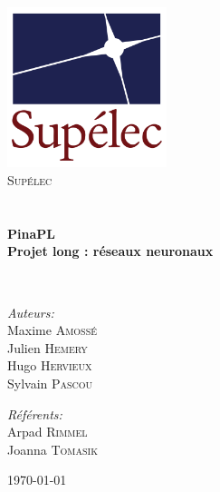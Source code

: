 
\begin{titlepage}
\begin{center}

\includegraphics[width=0.35\textwidth]{./images/logo.png}~\\[1cm]

\textsc{\LARGE Supélec}\\[1.5cm]

\textsc{\Large }\\[0.5cm]

\HRule
\\[0.4cm]

{\huge \bfseries PinaPL\\
Projet long : réseaux neuronaux \\[0.4cm] }

\HRule
\\[1.5cm]

\begin{minipage}{0.4\textwidth}
\begin{flushleft} \large
\emph{Auteurs:}\\
Maxime \textsc{Amossé}\\
Julien \textsc{Hemery}\\
Hugo \textsc{Hervieux}\\
Sylvain \textsc{Pascou}
\end{flushleft}
\end{minipage}
\begin{minipage}{0.4\textwidth}
\begin{flushright} \large
\emph{Référents:} \\
Arpad \textsc{Rimmel} \\
Joanna \textsc{Tomasik}
\end{flushright}
\end{minipage}

\vfill

{\large \today}

\end{center}
\end{titlepage}
